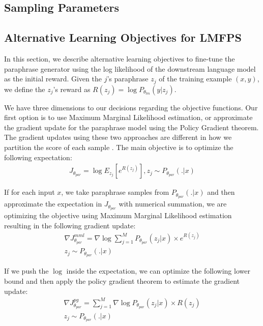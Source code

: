\documentclass[11pt]{article}
\begin{document}
\subsection{Sampling Parameters}

\subsection{Alternative Learning Objectives for LMFPS}
In this section, we describe alternative learning objectives to fine-tune the paraphrase generator using the log likelihood of the downstream language model as the initial reward. Given the $j$'s paraphrase $z_{j}$ of the training example $(x, y)$, we define the $z_{j}$'s reward as $R(z_{j}) = \log P_{\theta_{lm}} (y | z_{j})$. 

We have three dimensions to our decisions regarding the objective functions. Our first option is to use Maximum Marginal Likelihood estimation, or approximate the gradient update for the paraphrase model using the Policy Gradient theorem. The gradient updates using these two approaches are different in how we partition the score of each sample \cite{}. The main objective is to optimize the following expectation:
\begin{multline}
J_{\theta_{par}} = \log E_{z_{j}} [e^{R(z_{j})}], 
z_{j} \sim P_{\theta_{par}}(.|x)
\label{main-objective}
\end{multline}

If for each input $x$, we take paraphrase samples from $P_{\theta_{par}}(.|x)$ and then approximate the expectation in $J_{\theta_{par}}$ with numerical summation, we are optimizing the objective using Maximum Marginal Likelihood estimation resulting in the following gradient update:
\begin{multline}
\nabla J^{mml}_{\theta_{par}} = \nabla \log \sum^{M}_{j=1} P_{\theta_{par}}(z_{j}|x) \times e^{R(z_{j})} \\
z_{j} \sim P_{\theta_{par}}(.|x)
\label{mml-objective}
\end{multline}

If we push the $\log$ inside the expectation, we can optimize the following lower bound and then apply the policy gradient theorem \cite{10.5555/3009657.3009806} to estimate the gradient update:
\begin{multline}
\nabla J^{pg}_{\theta_{par}} = \sum^{M}_{j=1} \nabla \log P_{\theta_{par}}(z_{j}|x) \times R(z_{j}) \\
z_{j} \sim P_{\theta_{par}}(.|x)
\label{pg-objective}
\end{multline}
\end{document}
